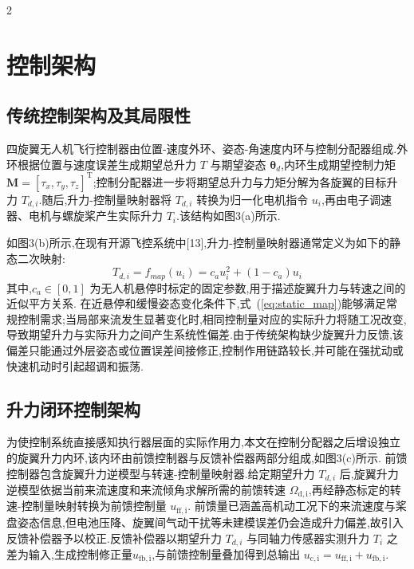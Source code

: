 \documentclass{aas}
\begin{document}
\begin{multicols}{2}
\section{控制架构}
\label{sec:control}

\subsection{传统控制架构及其局限性}
\label{subsec:conventional}

四旋翼无人机飞行控制器由位置-速度外环、姿态-角速度内环与控制分配器组成.外环根据位置与速度误差生成期望总升力 $T$ 与期望姿态 $\bm{\theta}_d$,内环生成期望控制力矩 $\bm{M}=[\tau_x,\tau_y,\tau_z]^{\mathrm{T}}$;控制分配器进一步将期望总升力与力矩分解为各旋翼的目标升力 $T_{d,i}$.随后,升力-控制量映射器将 $T_{d,i}$ 转换为归一化电机指令 $u_i$,再由电子调速器、电机与螺旋桨产生实际升力 $T_i$.该结构如图3(a)所示.

如图3(b)所示,在现有开源飞控系统中[13],升力-控制量映射器通常定义为如下的静态二次映射:
\begin{equation}
T_{d,i}=f_{map}(u_i)=c_a u_i^2+(1-c_a)u_i
\label{eq:static_map}
\end{equation}
其中,$c_a\in[0,1]$ 为无人机悬停时标定的固定参数,用于描述旋翼升力与转速之间的近似平方关系.
在近悬停和缓慢姿态变化条件下,式~(\ref{eq:static_map})能够满足常规控制需求;当局部来流发生显著变化时,相同控制量对应的实际升力将随工况改变,导致期望升力与实际升力之间产生系统性偏差.由于传统架构缺少旋翼升力反馈,该偏差只能通过外层姿态或位置误差间接修正,控制作用链路较长,并可能在强扰动或快速机动时引起超调和振荡.

\subsection{升力闭环控制架构}
\label{subsec:closed_loop}

为使控制系统直接感知执行器层面的实际作用力,本文在控制分配器之后增设独立的旋翼升力内环,该内环由前馈控制器与反馈补偿器两部分组成,如图3(c)所示.
前馈控制器包含旋翼升力逆模型与转速-控制量映射器.给定期望升力 $T_{d,i}$ 后,旋翼升力逆模型依据当前来流速度和来流倾角求解所需的前馈转速 $\Omega_{\mathrm{d,i}}$,再经静态标定的转速-控制量映射转换为前馈控制量 $u_{\mathrm{ff,i}}$.
前馈量已涵盖高机动工况下的来流速度与桨盘姿态信息,但电池压降、旋翼间气动干扰等未建模误差仍会造成升力偏差,故引入反馈补偿器予以校正.反馈补偿器以期望升力 $T_{d,i}$ 与同轴力传感器实测升力 $T_i$ 之差为输入,生成控制修正量$u_{\mathrm{fb,i}}$,与前馈控制量叠加得到总输出 $u_{\mathrm{c,i}}=u_{\mathrm{ff,i}}+u_{\mathrm{fb,i}}$.

\end{multicols}%
\end{document}
